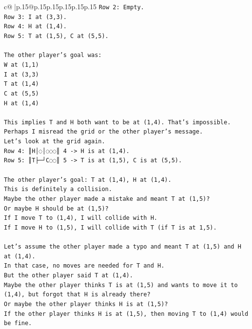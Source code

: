 \documentclass{article}
\begin{document}
{\begin{supertabular}{c@{$\;$}|p{.15\linewidth}@{}p{.15\linewidth}p{.15\linewidth}p{.15\linewidth}p{.15\linewidth}p{.15\linewidth}}
{{{\texttt{Row 2: Empty.} \\
\texttt{Row 3: I at (3,3).} \\
\texttt{Row 4: H at (1,4).} \\
\texttt{Row 5: T at (1,5), C at (5,5).} \\
\\ 
\texttt{The other player's goal was:} \\
\texttt{W at (1,1)} \\
\texttt{I at (3,3)} \\
\texttt{T at (1,4)} \\
\texttt{C at (5,5)} \\
\texttt{H at (1,4)} \\
\\ 
\texttt{This implies T and H both want to be at (1,4). That's impossible.} \\
\texttt{Perhaps I misread the grid or the other player's message.} \\
\texttt{Let's look at the grid again.} \\
\texttt{Row 4: ║H│◌│◌◌◌║ 4 {-}> H is at (1,4).} \\
\texttt{Row 5: ║T├─┘C◌◌║ 5 {-}> T is at (1,5), C is at (5,5).} \\
\\ 
\texttt{The other player's goal: T at (1,4), H at (1,4).} \\
\texttt{This is definitely a collision.} \\
\texttt{Maybe the other player made a mistake and meant T at (1,5)?} \\
\texttt{Or maybe H should be at (1,5)?} \\
\texttt{If I move T to (1,4), I will collide with H.} \\
\texttt{If I move H to (1,5), I will collide with T (if T is at 1,5).} \\
\\ 
\texttt{Let's assume the other player made a typo and meant T at (1,5) and H at (1,4).} \\
\texttt{In that case, no moves are needed for T and H.} \\
\texttt{But the other player said T at (1,4).} \\
\texttt{Maybe the other player thinks T is at (1,5) and wants to move it to (1,4), but forgot that H is already there?} \\
\texttt{Or maybe the other player thinks H is at (1,5)?} \\
\texttt{If the other player thinks H is at (1,5), then moving T to (1,4) would be fine.} \\
}}}
\end{supertabular}}
\end{document}
